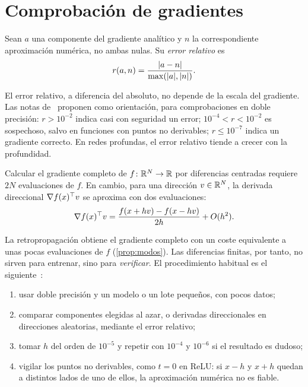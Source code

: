 \addtocounter{figure}{1}%

\section{Comprobación de gradientes}

\begin{definicion}\label{def:error-relativo}
Sean $a$ una componente del gradiente analítico y $n$ la correspondiente aproximación numérica, no ambas nulas. Su \emph{error relativo} es
\[
r(a,n)=\frac{\lvert a-n\rvert}{\max(\lvert a\rvert,\lvert n\rvert)}.
\]
\end{definicion}

El error relativo, a diferencia del absoluto, no depende de la escala del gradiente. Las notas de~\cite{cs231n} proponen como orientación, para comprobaciones en doble precisión: $r>10^{-2}$ indica casi con seguridad un error; $10^{-4}<r<10^{-2}$ es sospechoso, salvo en funciones con puntos no derivables; $r\le 10^{-7}$ indica un gradiente correcto. En redes profundas, el error relativo tiende a crecer con la profundidad.

\begin{proposicion}\label{prop:coste-fd}
Calcular el gradiente completo de $f\colon\mathbb{R}^{N}\to\mathbb{R}$ por diferencias centradas requiere $2N$ evaluaciones de $f$. En cambio, para una dirección $v\in\mathbb{R}^{N}$, la derivada direccional $\nabla f(x)^{\top} v$ se aproxima con dos evaluaciones:
\[
\nabla f(x)^{\top} v=\frac{f(x+hv)-f(x-hv)}{2h}+O(h^{2}).
\]
\end{proposicion}

La retropropagación obtiene el gradiente completo con un coste equivalente a unas pocas evaluaciones de $f$ (\cref{prop:modos}). Las diferencias finitas, por tanto, no sirven para entrenar, sino para \emph{verificar}. El procedimiento habitual es el siguiente~\cite{cs231n}:
\begin{enumerate}[label=\arabic*.]
  \item usar doble precisión y un modelo o un lote pequeños, con pocos datos;
  \item comparar componentes elegidas al azar, o derivadas direccionales en direcciones aleatorias, mediante el error relativo;
  \item tomar $h$ del orden de $10^{-5}$ y repetir con $10^{-4}$ y $10^{-6}$ si el resultado es dudoso;
  \item vigilar los puntos no derivables, como $t=0$ en ReLU: si $x-h$ y $x+h$ quedan a distintos lados de uno de ellos, la aproximación numérica no es fiable.
\end{enumerate}

\addtocounter{definicion}{1}%

